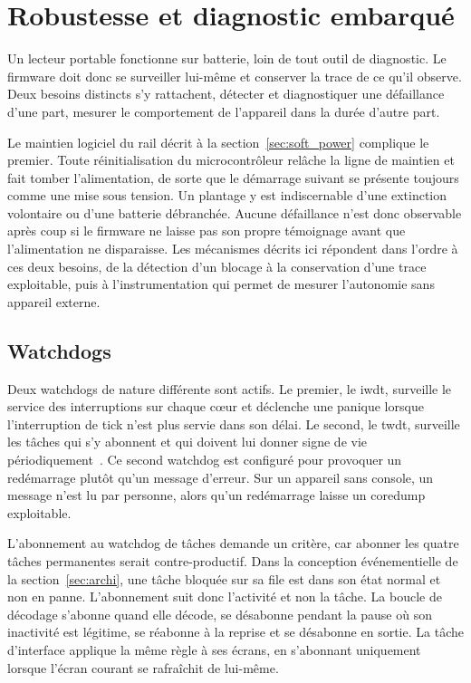 \section{Robustesse et diagnostic embarqué}
\label{sec:soft_robustness}

Un lecteur portable fonctionne sur batterie, loin de tout outil de diagnostic. Le firmware doit donc se surveiller lui-même et conserver la trace de ce qu'il observe. Deux besoins distincts s'y rattachent, détecter et diagnostiquer une défaillance d'une part, mesurer le comportement de l'appareil dans la durée d'autre part.

Le maintien logiciel du rail décrit à la section~\ref{sec:soft_power} complique le premier. Toute réinitialisation du microcontrôleur relâche la ligne de maintien et fait tomber l'alimentation, de sorte que le démarrage suivant se présente toujours comme une mise sous tension. Un plantage y est indiscernable d'une extinction volontaire ou d'une batterie débranchée. Aucune défaillance n'est donc observable après coup si le firmware ne laisse pas son propre témoignage avant que l'alimentation ne disparaisse. Les mécanismes décrits ici répondent dans l'ordre à ces deux besoins, de la détection d'un blocage à la conservation d'une trace exploitable, puis à l'instrumentation qui permet de mesurer l'autonomie sans appareil externe.

\subsection{Watchdogs}

Deux watchdogs de nature différente sont actifs. Le premier, le \gls{iwdt}, surveille le service des interruptions sur chaque cœur et déclenche une panique lorsque l'interruption de tick n'est plus servie dans son délai. Le second, le \gls{twdt}, surveille les tâches qui s'y abonnent et qui doivent lui donner signe de vie périodiquement~\cite{ESP32_IDF_wdt}. Ce second watchdog est configuré pour provoquer un redémarrage plutôt qu'un message d'erreur. Sur un appareil sans console, un message n'est lu par personne, alors qu'un redémarrage laisse un \gls{coredump} exploitable.

L'abonnement au watchdog de tâches demande un critère, car abonner les quatre tâches permanentes serait contre-productif. Dans la conception événementielle de la section~\ref{sec:archi}, une tâche bloquée sur sa file est dans son état normal et non en panne. L'abonnement suit donc l'activité et non la tâche. La boucle de décodage s'abonne quand elle décode, se désabonne pendant la pause où son inactivité est légitime, se réabonne à la reprise et se désabonne en sortie. La tâche d'interface applique la même règle à ses écrans, en s'abonnant uniquement lorsque l'écran courant se rafraîchit de lui-même.

